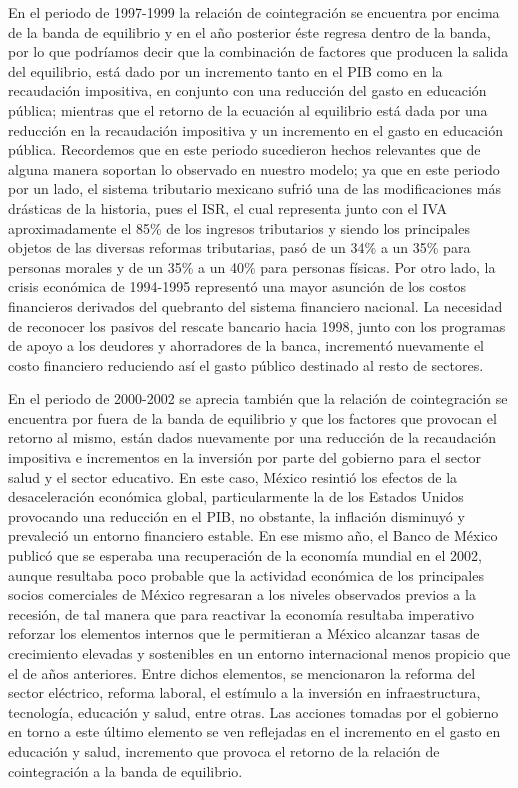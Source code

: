En el periodo de 1997-1999 la relación de cointegración se encuentra por encima de la banda de equilibrio y en el año posterior éste regresa dentro de la banda, por lo que podríamos decir que la combinación de factores que producen la salida del equilibrio, está dado por un incremento tanto en el PIB como en la recaudación impositiva, en conjunto con una reducción del gasto en educación pública; mientras que el retorno de la ecuación al equilibrio está dada por una reducción en la recaudación impositiva y un incremento en el gasto en educación pública. Recordemos que en este periodo sucedieron hechos relevantes que de alguna manera soportan lo observado en nuestro modelo; ya que en este periodo por un lado, el sistema tributario mexicano sufrió una de las modificaciones más drásticas de la historia, pues el ISR, el cual representa junto con el IVA aproximadamente el 85\% de los ingresos tributarios y siendo los principales objetos de las diversas reformas tributarias, pasó de un 34\% a un 35\% para personas morales y de un 35\% a un 40\% para personas físicas. Por otro lado, la crisis económica de 1994-1995 representó una mayor asunción de los costos financieros derivados del quebranto del sistema financiero nacional. La necesidad de reconocer los pasivos del rescate bancario hacia 1998, junto con los programas de apoyo a los deudores y ahorradores de la banca, incrementó nuevamente el costo financiero reduciendo así el gasto público destinado al resto de sectores.\bigskip


En el periodo de 2000-2002 se aprecia también que la relación de cointegración se encuentra por fuera de la banda de equilibrio y que los factores que provocan el retorno al mismo, están dados nuevamente por una reducción de la recaudación impositiva e incrementos en la inversión por parte del gobierno para el sector salud y el sector educativo. En este caso, México resintió los efectos de la desaceleración económica global, particularmente la de los Estados Unidos provocando una reducción en el PIB, no obstante, la inflación disminuyó y prevaleció un entorno financiero estable. En ese mismo año, el Banco de México publicó que se esperaba una recuperación de la economía mundial en el 2002, aunque resultaba poco probable que la actividad económica de los principales socios comerciales de México regresaran a los niveles observados previos a la recesión, de tal manera que para reactivar la economía resultaba imperativo reforzar los elementos internos que le permitieran a México alcanzar tasas de crecimiento elevadas y sostenibles en un entorno internacional menos propicio que el de años anteriores. Entre dichos elementos, se mencionaron la reforma del sector eléctrico, reforma laboral, el estímulo a la inversión en infraestructura, tecnología, educación y salud, entre otras. Las acciones tomadas por el gobierno en torno a este último elemento se ven reflejadas en el incremento en el gasto en educación y salud, incremento que provoca el retorno de la relación de cointegración a la banda de equilibrio.\bigskip



